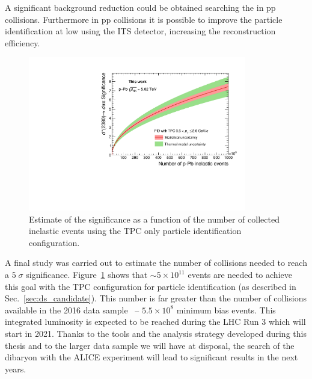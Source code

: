 A significant background reduction could be obtained searching the \ds in pp collisions.
Furthermore in pp collisions it is possible to improve the particle identification at low \pt
using the ITS detector, increasing the reconstruction efficiency.

\begin{figure} [htb]
    \centering
    \includegraphics[width=0.85\textwidth]{gfx/sig_TPC}
    \caption{Estimate of the significance as a function of the number of collected \pPb inelastic events using the TPC only particle identification configuration.}
	\label{fig:proj1}
\end{figure}

A final study was carried out to estimate the number of \pPb collisions needed to reach a
$5\;\sigma$ significance.
Figure~\ref{fig:proj1} shows that $\sim 5\times10^{11}$ events are needed to achieve this goal 
with the TPC configuration for particle identification (as described in Sec.~\ref{sec:ds_candidate}).
This number is far greater than the number of \pPb collisions available in the 2016 data sample
\ -- $5.5\times10^{8}$ minimum bias events.
This integrated luminosity is expected to be reached during the LHC Run 3 which will start in 2021.
Thanks to the tools and the analysis strategy developed during this thesis and to the larger data sample 
we will have at disposal, the search of the \ds dibaryon with the ALICE experiment will lead to 
significant results in the next years.

